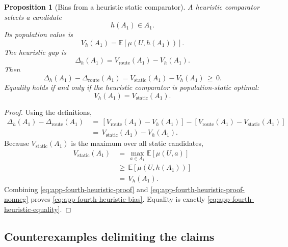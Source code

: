 \documentclass{article} %
\newtheorem{proposition}[theorem]{Proposition}
\begin{document}
\begin{proposition}[Bias from a heuristic static comparator]
\label{prop:7}
A heuristic comparator selects a candidate
\begin{equation}
\label{eq:app-fourth-heuristic-h}
h(A_1)\in A_1.
\end{equation}
Its population value is
\begin{equation}
\label{eq:app-fourth-heuristic-vh}
V_h(A_1)
=
\mathbb{E}[\mu(U,h(A_1))].
\end{equation}
The heuristic gap is
\begin{equation}
\label{eq:app-fourth-heuristic-dh}
\Delta_h(A_1)
=
V_{\mathrm{route}}(A_1)-V_h(A_1).
\end{equation}
Then
\begin{equation}
\label{eq:app-fourth-heuristic-bias}
\Delta_h(A_1)
-
\Delta_{\mathrm{route}}(A_1)
=
V_{\mathrm{static}}(A_1)-V_h(A_1)
\,\ge\,
0.
\end{equation}
Equality holds if and only if the heuristic comparator is population-static optimal:
\begin{equation}
\label{eq:app-fourth-heuristic-equality}
V_h(A_1)
=
V_{\mathrm{static}}(A_1).
\end{equation}
\end{proposition}

\begin{proof}
Using the definitions,
\begin{align}
\label{eq:app-fourth-heuristic-proof}
\Delta_h(A_1)
-
\Delta_{\mathrm{route}}(A_1)
&\,=\,
\left[
V_{\mathrm{route}}(A_1)-V_h(A_1)
\right]
-
\left[
V_{\mathrm{route}}(A_1)-V_{\mathrm{static}}(A_1)
\right]
\\
&\,=\,
V_{\mathrm{static}}(A_1)-V_h(A_1).
\end{align}
Because \(V_{\mathrm{static}}(A_1)\) is the maximum over all static candidates,
\begin{align}
\label{eq:app-fourth-heuristic-proof-nonneg}
V_{\mathrm{static}}(A_1)
&\,=\,
\max_{a\in A_1}
\mathbb{E}[\mu(U,a)]
\\
&\,\ge\,
\mathbb{E}[\mu(U,h(A_1))]
\\
&\,=\,
V_h(A_1).
\end{align}
Combining \eqref{eq:app-fourth-heuristic-proof} and \eqref{eq:app-fourth-heuristic-proof-nonneg} proves \eqref{eq:app-fourth-heuristic-bias}.  Equality is exactly \eqref{eq:app-fourth-heuristic-equality}.
\end{proof}

\subsection{Counterexamples delimiting the claims}
\end{document}
